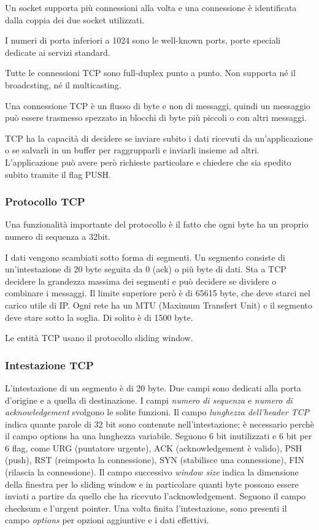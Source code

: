 Un socket supporta più connessioni alla volta e una connessione è identificata dalla coppia dei due socket utilizzati.

I numeri di porta inferiori a 1024 sono le well-known ports, porte speciali dedicate ai servizi standard.

Tutte le connessioni TCP sono full-duplex punto a punto. Non supporta né il broadcsting, né il multicasting.

Una connessione TCP è un flusso di byte e non di messaggi, quindi un messaggio può essere trasmesso spezzato in blocchi di byte più piccoli o con altri messaggi. 

TCP ha la capacità di decidere se inviare subito i dati ricevuti da un'applicazione o se salvarli in un buffer per raggrupparli e inviarli insieme ad altri.
L'applicazione può avere però richieste particolare e chiedere che sia spedito subito tramite il flag PUSH.

\subsubsection{Protocollo TCP}
Una funzionalità importante del protocollo è il fatto che ogni byte ha un proprio numero di sequenza a 32bit.

I dati vengono scambiati sotto forma di segmenti.
Un segmento consiste di un'intestazione di 20 byte seguita da 0 (ack) o più byte di dati.
Sta a TCP decidere la grandezza massima dei segmenti e può decidere se dividere o combinare i messaggi.
Il limite superiore però è di 65615 byte, che deve starci nel carico utile di IP.
Ogni rete ha un MTU (Maximum Transfert Unit) e il segmento deve stare sotto la soglia.
Di solito è di 1500 byte.

Le entità TCP usano il protocollo sliding window.

\subsubsection{Intestazione TCP}
L'intestazione di un segmento è di 20 byte.
Due campi sono dedicati alla porta d'origine e a quella di destinazione.
I campi \textit{numero di sequenza} e \textit{numero di acknowledgement} svolgono le solite funzioni.
Il campo \textit{lunghezza dell'header TCP} indica quante parole di 32 bit sono contenute nell'intestazione; 
è necessario perchè il campo options ha una lunghezza variabile.
Seguono 6 bit inutilizzati e 6 bit per 6 flag, come URG (puntatore urgente), ACK (acknowledgement è valido), PSH (push), RST (reimposta la connessione), SYN (stabilisce una connessione), FIN (rilascia la connessione).
Il campo successivo \textit{window size} indica la dimensione della finestra per lo sliding window e in particolare quanti byte possono essere inviati a partire da quello che ha ricevuto l'acknowledgement.
Seguono il campo checksum e l'urgent pointer.
Una volta finita l'intestazione, sono presenti il campo \textit{options} per opzioni aggiuntive e i dati effettivi.

